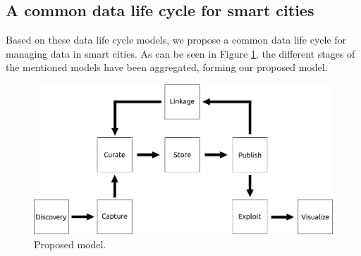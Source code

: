 \subsection{A common data life cycle for smart cities}

Based on these data life cycle models, we propose a common data life cycle for managing data in smart cities. As can be seen in Figure \ref{fig:model}, the different stages of the mentioned models have been aggregated, forming our proposed model.

\begin{figure}
    \center
    \includegraphics[width=0.9\linewidth]{img/data_lifecycle/model.pdf}
    \caption{Proposed model.}
    \label{fig:model}
\end{figure}

